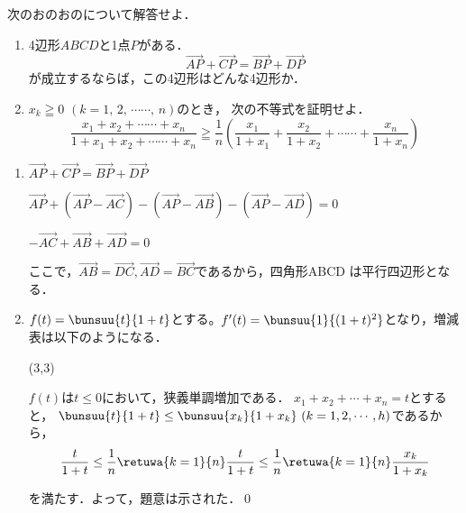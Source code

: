 \begin{problem}
次のおのおのについて解答せよ．
\begin{enumerate}
\item 4辺形$ABCD$と1点$P$がある．
\[ \Vec{AP}+\Vec{CP}=\Vec{BP}+\Vec{DP} \]
が成立するならば，この4辺形はどんな4辺形か．
\item $x_k\geqq0$ $(k=1, \, 2, \, \cdots\cdots, \, n)$のとき，
次の不等式を証明せよ．
\[ \frac{x_1+x_2+\cdots\cdots+x_n}{1+x_1+x_2+\cdots\cdots+x_n} \geqq
\frac{1}{n}\left( \frac{x_1}{1+x_1}+\frac{x_2}{1+x_2}+\cdots\cdots+\frac{x_n}{1+x_n} \right) \]
\end{enumerate}
\end{problem}


\begin{enumerate}
  \item $\Vec{AP} + \Vec{CP} = \Vec{BP} + \Vec{DP}$

  $\Vec{AP} + (\Vec{AP} - \Vec{AC}) - (\Vec{AP}- \Vec{AB}) - (\Vec{AP} - \Vec{AD}) = 0$

  $-\Vec{AC} + \Vec{AB} + \Vec{AD} = 0$

  ここで，$\Vec{AB} = \Vec{DC}, \Vec{AD} = \Vec{BC}$であるから，四角形ABCD
  は平行四辺形となる．

  \item $f(t) = \bunsuu{t}{1+t}$とする。$f'(t) = \bunsuu{1}{(1+t)^2}$となり，増減表は以下のようになる．

  \RESETKEYA
  \zogen(3,3)

  $f(t)$は$t\leq 0$において，狭義単調増加である．
  $x_1 + x_2 + \cdots + x_n = t$とすると，
  $\bunsuu{t}{1+t} \leq \bunsuu{x_k}{1+x_k}\ (k = 1,2,\cdots,h)$であるから，
  \[\frac{t}{1+t} \leq \frac{1}{n}\retuwa{k=1}{n}\frac{t}{1+t} \leq \frac{1}{n}\retuwa{k=1}{n}\frac{x_k}{1+x_k}\]

  を満たす．よって，題意は示された．\qed
\end{enumerate}
